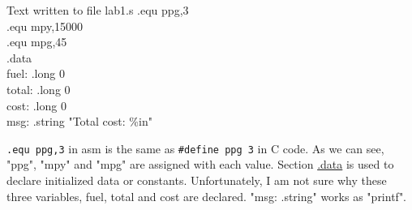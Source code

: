 \documentclass{article}
\begin{document}
\begin{GFT}{Text written to file lab1.s}
\+.equ ppg,3 \\
\+.equ mpy,15000\\
\+.equ mpg,45\\
\+.data\\
\+  fuel: .long 0\\
\+  total: .long 0\\
\+  cost: .long 0\\
\+msg: .string "Total cost: \%i\Backslash{}n"\\
\end{GFT}
\verb|.equ ppg,3|  in asm is the same as \verb|#define ppg 3| in C code. As we can see, "ppg", "mpy" and "mpg" are assigned with each value. Section \href{http://goo.gl/4czLEp}{.data} is used to declare initialized data or constants. Unfortunately, I am not sure why these three variables, fuel, total and cost are declared. "msg: .string" works as "printf". \\
\noindent{\color{red}\rule{\linewidth}{0.5mm}} \\
\end{document}
